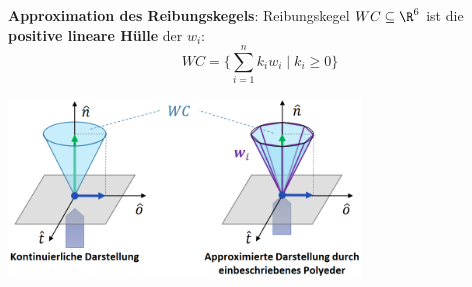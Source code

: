 \bigskip
\textbf{Approximation des Reibungskegels}: Reibungskegel $WC\subseteq\R^6$ ist die \textbf{positive lineare Hülle} der $w_i$:
$$WC=\{\sum\limits_{i=1}^{n} k_iw_i\mid k_i\geq 0\}$$
\begin{center}
	\includegraphics[width=0.7\textwidth]{images/polyeder.png}
\end{center}

